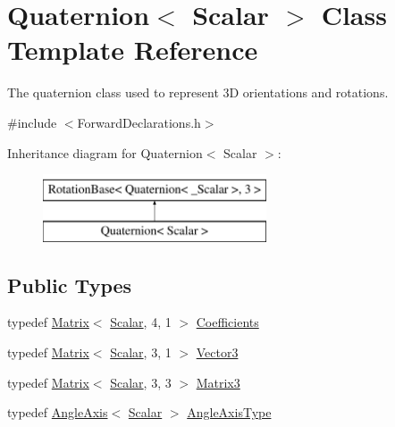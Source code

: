 \hypertarget{class_quaternion}{\section{Quaternion$<$ Scalar $>$ Class Template Reference}
\label{class_quaternion}
}


The quaternion class used to represent 3\-D orientations and rotations.  




{\ttfamily \#include $<$Forward\-Declarations.\-h$>$}

Inheritance diagram for Quaternion$<$ Scalar $>$\-:\begin{figure}[H]
\begin{center}
\leavevmode
\includegraphics[height=2.000000cm]{class_quaternion}
\end{center}
\end{figure}
\subsection*{Public Types}
\begin{DoxyCompactItemize}
\item 
typedef \hyperlink{class_matrix}{Matrix}$<$ \hyperlink{class_rotation_base_ae9cbe0a3a87dfe2fa70958d9fe948a09}{Scalar}, 4, 1 $>$ \hyperlink{class_quaternion_ad622be107fa0707a98a1966345f961a1}{Coefficients}
\item 
typedef \hyperlink{class_matrix}{Matrix}$<$ \hyperlink{class_rotation_base_ae9cbe0a3a87dfe2fa70958d9fe948a09}{Scalar}, 3, 1 $>$ \hyperlink{class_quaternion_a585d82ad2af10253cfcbd08241bc6ca2}{Vector3}
\item 
typedef \hyperlink{class_matrix}{Matrix}$<$ \hyperlink{class_rotation_base_ae9cbe0a3a87dfe2fa70958d9fe948a09}{Scalar}, 3, 3 $>$ \hyperlink{class_quaternion_a9fb40d1207bd7f8f5e2fcfefb353c7ba}{Matrix3}
\item 
typedef \hyperlink{class_angle_axis}{Angle\-Axis}$<$ \hyperlink{class_rotation_base_ae9cbe0a3a87dfe2fa70958d9fe948a09}{Scalar} $>$ \hyperlink{class_quaternion_a9669c6f15433959ede73917adff4ce53}{Angle\-Axis\-Type}
\end{DoxyCompactItemize}

